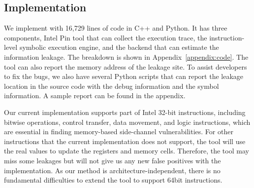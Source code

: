 \subsection{Implementation}
We implement \tool{} with 16,729 lines of code in C++ and Python. It has three
components, Intel Pin tool that can collect the execution trace, the
instruction-level symbolic execution engine, and the backend that can estimate
the information leakage. The breakdown is shown in
Appendix~\ref{appendix:code}. The tool can also report the memory address of
the leakage site. To assist developers to fix the bugs, we also have several
Python scripts that can report the leakage location in the source code with the
debug information and the symbol information. A sample report can be found in
the appendix.

Our current implementation supports part of Intel 32-bit instructions,
including bitwise operations, control transfer, data movement, and logic
instructions, which are essential in finding memory-based side-channel
vulnerabilities. For other instructions that the current implementation does not
support, the tool will use the real values to update the registers and memory
cells. Therefore, the tool may miss some leakages but will not give us any new
false positives with the implementation. As our method is architecture-independent,
there is no fundamental difficulties to extend the tool to support 64bit
instructions. 
